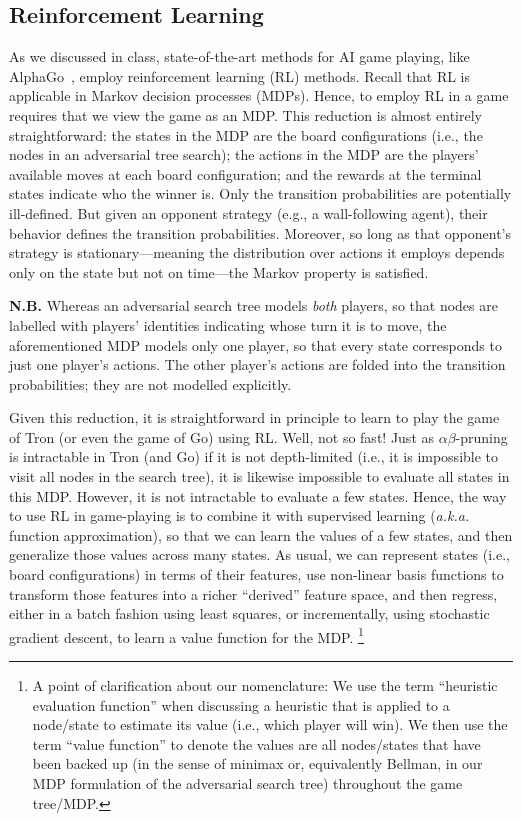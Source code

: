 \documentclass{article}
\begin{document}
\subsection{Reinforcement Learning}
As we discussed in class, state-of-the-art methods for AI game
playing, like AlphaGo~\cite{silver16}, employ reinforcement learning
(RL) methods.  Recall that RL is applicable in Markov decision
processes (MDPs).  Hence, to employ RL in a game requires that we view
the game as an MDP.  This reduction is almost entirely
straightforward: the states in the MDP are the board configurations
(i.e., the nodes in an adversarial tree search); the actions in the
MDP are the players' available moves at each board configuration; and
the rewards at the terminal states indicate who the winner is.  Only
the transition probabilities are potentially ill-defined.  But given
an opponent strategy (e.g., a wall-following agent), their behavior
defines the transition probabilities.  Moreover, so long as that
opponent's strategy is stationary---meaning the distribution over
actions it employs depends only on the state but not on time---the
Markov property is satisfied.

\textbf{N.B.} Whereas an adversarial search tree models \emph{both\/}
players, so that nodes are labelled with players' identities
indicating whose turn it is to move, the aforementioned MDP models
only one player, so that every state corresponds to just one player's
actions.  The other player's actions are folded into the transition
probabilities; they are not modelled explicitly.

Given this reduction, it is straightforward in principle to learn to
play the game of Tron (or even the game of Go) using RL.  Well, not so
fast!  Just as $\alpha\beta$-pruning is intractable in Tron (and Go)
if it is not depth-limited (i.e., it is impossible to visit all nodes
in the search tree), it is likewise impossible to evaluate all states
in this MDP.  However, it is not intractable to evaluate a few states.
Hence, the way to use RL in game-playing is to combine it with
supervised learning (\emph{a.k.a.\/} function approximation), so that
we can learn the values of a few states, and then generalize those
values across many states.  As usual, we can represent states (i.e.,
board configurations) in terms of their features, use non-linear basis
functions to transform those features into a richer ``derived''
feature space, and then regress, either in a batch fashion using least
squares, or incrementally, using stochastic gradient descent, to learn
a value function for the MDP.%
\footnote{A point of clarification about our nomenclature: We use the
  term ``heuristic evaluation function'' when discussing a heuristic
  that is applied to a node/state to estimate its value (i.e., which
  player will win).  We then use the term ``value function'' to denote
  the values are all nodes/states that have been backed up (in the
  sense of minimax or, equivalently Bellman, in our MDP formulation of
  the adversarial search tree) throughout the game tree/MDP.}
\end{document}
